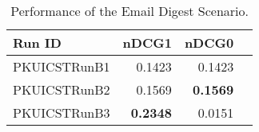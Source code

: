 \begin{table}[htbp]
\centering
\caption{Performance of the Email Digest Scenario.}
\label{tab:resB}
\begin{tabular}{lrrr}
\hline
Run ID&nDCG1&nDCG0\\
\hline
PKUICSTRunB1&0.1423&0.1423\\
PKUICSTRunB2&0.1569&\textbf{0.1569}\\
PKUICSTRunB3&\textbf{0.2348}&0.0151\\
\hline
\end{tabular}
\end{table}


